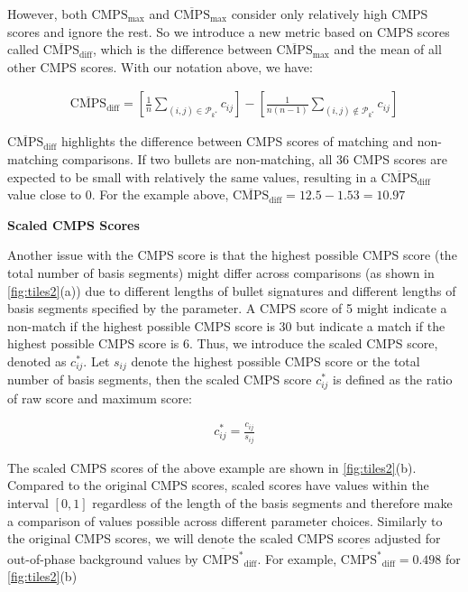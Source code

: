 However, both \(\mathrm{CMPS_{max}}\) and
\(\mathrm{\overline{CMPS}_{max}}\) consider only relatively high CMPS
scores and ignore the rest. So we introduce a new metric based on CMPS
scores called \(\mathrm{\overline{CMPS}_{diff}}\), which is the
difference between \(\mathrm{\overline{CMPS}_{max}}\) and the mean of
all other CMPS scores. With our notation above, we have:

\begin{align}
\mathrm{\overline{CMPS}_{diff}} = \left[  \frac{1}{n} \sum_{(i,j) \in \mathcal{P}_{k^*}} c_{ij}\right] - \left[  \frac{1}{n(n-1)} \sum_{(i,j) \notin \mathcal{P}_{k^*}} c_{ij}\right]
\end{align}

\(\mathrm{\overline{CMPS}_{diff}}\) highlights the difference between
CMPS scores of matching and non-matching comparisons. If two bullets are
non-matching, all 36 CMPS scores are expected to be small with
relatively the same values, resulting in a
\(\mathrm{\overline{CMPS}_{diff}}\) value close to 0. For the example
above, \(\mathrm{\overline{CMPS}_{diff}} = 12.5 - 1.53 = 10.97\)

\textbf{Scaled CMPS Scores}

Another issue with the CMPS score is that the highest possible CMPS
score (the total number of basis segments) might differ across
comparisons (as shown in \autoref{fig:tiles2}(a)) due to different
lengths of bullet signatures and different lengths of basis segments
specified by the parameter. A CMPS score of 5 might indicate a non-match
if the highest possible CMPS score is 30 but indicate a match if the
highest possible CMPS score is 6. Thus, we introduce the scaled CMPS
score, denoted as \(c^*_{ij}\). Let \(s_{ij}\) denote the highest
possible CMPS score or the total number of basis segments, then the
scaled CMPS score \(c^*_{ij}\) is defined as the ratio of raw score and
maximum score:

\begin{align}
c^*_{ij} = \frac{c_{ij}}{s_{ij}}
\end{align}

The scaled CMPS scores of the above example are shown in
\autoref{fig:tiles2}(b). Compared to the original CMPS scores, scaled
scores have values within the interval \([0, 1]\) regardless of the
length of the basis segments and therefore make a comparison of values
possible across different parameter choices. Similarly to the original
CMPS scores, we will denote the scaled CMPS scores adjusted for
out-of-phase background values by \(\mathrm{\overline{CMPS^*}_{diff}}\).
For example, \(\mathrm{\overline{CMPS^*}_{diff}} = 0.498\) for
\autoref{fig:tiles2}(b)

